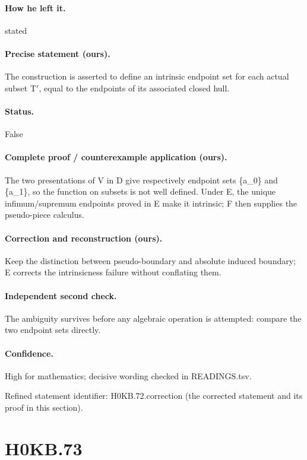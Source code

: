 \paragraph{How he left it.} stated

\paragraph{Precise statement (ours).} The construction is asserted to define an intrinsic endpoint set for each actual subset T\ensuremath{\prime}, equal to the endpoints of its associated closed hull.

\paragraph{Status.} False

\paragraph{Complete proof / counterexample application (ours).} The two presentations of V in D give respectively endpoint sets \{a\_0\} and \{a\_1\}, so the function on subsets is not well defined. Under E, the unique infimum/supremum endpoints proved in E make it intrinsic; F then supplies the pseudo-piece calculus.

\paragraph{Correction and reconstruction (ours).} Keep the distinction between pseudo-boundary and absolute induced boundary; E corrects the intrinsicness failure without conflating them.

\paragraph{Independent second check.} The ambiguity survives before any algebraic operation is attempted: compare the two endpoint sets directly.

\paragraph{Confidence.} High for mathematics; decisive wording checked in READINGS.tsv.

\noindent Refined statement identifier: H0KB.72.correction (the corrected statement and its proof in this section).

\section*{H0KB.73}\label{statement:H0KB.73}
